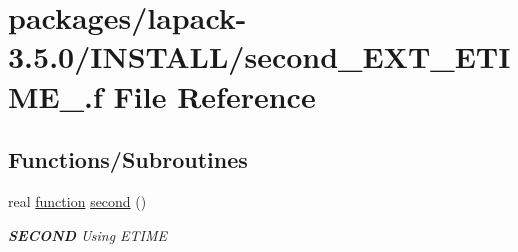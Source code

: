 \hypertarget{second__EXT__ETIME___8f}{}\section{packages/lapack-\/3.5.0/\+I\+N\+S\+T\+A\+L\+L/second\+\_\+\+E\+X\+T\+\_\+\+E\+T\+I\+M\+E\+\_\+.f File Reference}
\label{second__EXT__ETIME___8f}
\subsection*{Functions/\+Subroutines}
\begin{DoxyCompactItemize}
\item 
real \hyperlink{afunc_8m_a7b5e596df91eadea6c537c0825e894a7}{function} \hyperlink{group__auxOTHERauxiliary_gae9f971a8b343bd2fcb85c3b16da97f10}{second} ()
\begin{DoxyCompactList}\small\item\em {\bfseries S\+E\+C\+O\+N\+D} Using E\+T\+I\+M\+E \end{DoxyCompactList}\end{DoxyCompactItemize}
